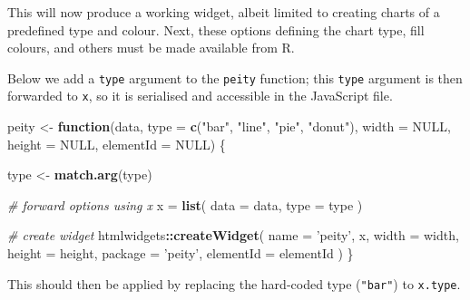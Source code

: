 \documentclass[10pt,]{krantz}
\makeatletter
\newenvironment{Shaded}{\begin{snugshade}}{\end{snugshade}}
\newcommand{\AttributeTok}[1]{\textcolor[rgb]{0.61,0.61,0.61}{#1}}
\newcommand{\CommentTok}[1]{\textcolor[rgb]{0.37,0.37,0.37}{\textit{#1}}}
\newcommand{\ControlFlowTok}[1]{\textcolor[rgb]{0.27,0.27,0.27}{\textbf{#1}}}
\newcommand{\DataTypeTok}[1]{\textcolor[rgb]{0.27,0.27,0.27}{#1}}
\newcommand{\KeywordTok}[1]{\textcolor[rgb]{0.27,0.27,0.27}{\textbf{#1}}}
\newcommand{\NormalTok}[1]{#1}
\newcommand{\OperatorTok}[1]{\textcolor[rgb]{0.43,0.43,0.43}{\textbf{#1}}}
\newcommand{\OtherTok}[1]{\textcolor[rgb]{0.37,0.37,0.37}{#1}}
\newcommand{\StringTok}[1]{\textcolor[rgb]{0.5,0.5,0.5}{#1}}
\newcommand{\VariableTok}[1]{\textcolor[rgb]{0,0,0}{#1}}
\newenvironment{kframe}{%
\medskip{}
\setlength{\fboxsep}{.8em}
 \def\at@end@of@kframe{}%
 \ifinner\ifhmode%
  \def\at@end@of@kframe{\end{minipage}}%
  \begin{minipage}{\columnwidth}%
 \fi\fi%
 \def\FrameCommand##1{\hskip\@totalleftmargin \hskip-\fboxsep
 \colorbox{shadecolor}{##1}\hskip-\fboxsep
     \hskip-\linewidth \hskip-\@totalleftmargin \hskip\columnwidth}%
 \MakeFramed {\advance\hsize-\width
   \@totalleftmargin\z@ \linewidth\hsize
   \@setminipage}}%
 {\par\unskip\endMakeFramed%
 \at@end@of@kframe}
\renewenvironment{Shaded}{\begin{kframe}}{\end{kframe}}
\makeatother
\begin{document}
This will now produce a working widget, albeit limited to creating charts of a predefined type and colour. Next, these options defining the chart type, fill colours, and others must be made available from R.

Below we add a \texttt{type} argument to the \texttt{peity} function; this \texttt{type} argument is then forwarded to \texttt{x}, so it is serialised and accessible in the JavaScript file.

\begin{Shaded}
\begin{Highlighting}[]
\NormalTok{peity <-}\StringTok{ }\ControlFlowTok{function}\NormalTok{(data, }\DataTypeTok{type =} \KeywordTok{c}\NormalTok{(}\StringTok{"bar"}\NormalTok{, }\StringTok{"line"}\NormalTok{, }\StringTok{"pie"}\NormalTok{, }\StringTok{"donut"}\NormalTok{), }
  \DataTypeTok{width =} \OtherTok{NULL}\NormalTok{, }\DataTypeTok{height =} \OtherTok{NULL}\NormalTok{, }\DataTypeTok{elementId =} \OtherTok{NULL}\NormalTok{) \{}

\NormalTok{  type <-}\StringTok{ }\KeywordTok{match.arg}\NormalTok{(type)}

  \CommentTok{# forward options using x}
\NormalTok{  x =}\StringTok{ }\KeywordTok{list}\NormalTok{(}
    \DataTypeTok{data =}\NormalTok{ data,}
    \DataTypeTok{type =}\NormalTok{ type}
\NormalTok{  )}

  \CommentTok{# create widget}
\NormalTok{  htmlwidgets}\OperatorTok{::}\KeywordTok{createWidget}\NormalTok{(}
    \DataTypeTok{name =} \StringTok{'peity'}\NormalTok{,}
\NormalTok{    x,}
    \DataTypeTok{width =}\NormalTok{ width,}
    \DataTypeTok{height =}\NormalTok{ height,}
    \DataTypeTok{package =} \StringTok{'peity'}\NormalTok{,}
    \DataTypeTok{elementId =}\NormalTok{ elementId}
\NormalTok{  )}
\NormalTok{\}}
\end{Highlighting}
\end{Shaded}

This should then be applied by replacing the hard-coded type (\texttt{"bar"}) to \texttt{x.type}.

\begin{Shaded}
\end{Shaded}
\end{document}
